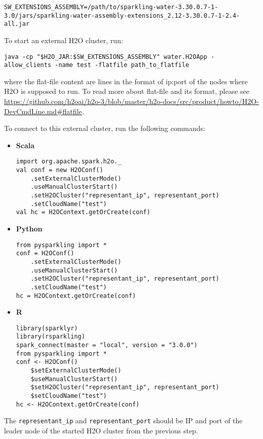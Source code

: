 \begin{lstlisting}[style=bash]
SW_EXTENSIONS_ASSEMBLY=/path/to/sparkling-water-3.30.0.7-1-3.0/jars/sparkling-water-assembly-extensions_2.12-3.30.0.7-1-2.4-all.jar
\end{lstlisting}

To start an external H2O cluster, run:

\begin{lstlisting}[style=bash]
java -cp "$H2O_JAR:$SW_EXTENSIONS_ASSEMBLY" water.H2OApp -allow_clients -name test -flatfile path_to_flatfile
\end{lstlisting}


where the flat-file content are lines in the format of ip:port of the nodes where H2O is supposed to run. To
read more about flat-file and its format, please
see \url{https://github.com/h2oai/h2o-3/blob/master/h2o-docs/src/product/howto/H2O-DevCmdLine.md#flatfile}.


To connect to this external cluster, run the following commands:

\begin{itemize}
    \item \textbf{Scala} \begin{lstlisting}[style=Scala]
import org.apache.spark.h2o._
val conf = new H2OConf()
    .setExternalClusterMode()
    .useManualClusterStart()
    .setH2OCluster("representant_ip", representant_port)
    .setCloudName("test")
val hc = H2OContext.getOrCreate(conf)
    \end{lstlisting}
    \item \textbf{Python} \begin{lstlisting}[style=Python]
from pysparkling import *
conf = H2OConf()
    .setExternalClusterMode()
    .useManualClusterStart()
    .setH2OCluster("representant_ip", representant_port)
    .setCloudName("test")
hc = H2OContext.getOrCreate(conf)
    \end{lstlisting}
    \item \textbf{R} \begin{lstlisting}[style=R]
library(sparklyr)
library(rsparkling)
spark_connect(master = "local", version = "3.0.0")
from pysparkling import *
conf <- H2OConf()
    $setExternalClusterMode()
    $useManualClusterStart()
    $setH2OCluster("representant_ip", representant_port)
    $setCloudName("test")
hc <- H2OContext.getOrCreate(conf)
    \end{lstlisting}
\end{itemize}

The \texttt{representant\_ip} and \texttt{representant\_port} should be IP and port of the leader node of the started
H2O cluster from the previous step.

